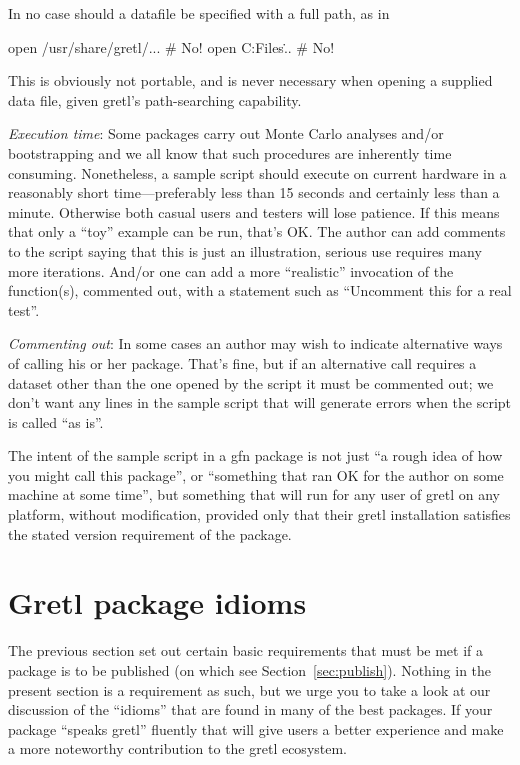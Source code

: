 \documentclass[oneside]{book}
\begin{document}
 In no case should a datafile be specified with a full path, as in
 \begin{code}
 open /usr/share/gretl/...       # No!
 open C:\Program Files\gretl\... # No!
 \end{code}
  This is obviously not portable, and is never necessary when opening
  a supplied data file, given gretl's path-searching capability.

\vspace{1ex}
\textit{Execution time}: Some packages carry out Monte Carlo
  analyses and/or bootstrapping and we all know that such procedures
  are inherently time consuming. Nonetheless, a sample script should
  execute on current hardware in a reasonably short time---preferably
  less than 15 seconds and certainly less than a minute. Otherwise
  both casual users and testers will lose patience. If this means that
  only a ``toy'' example can be run, that's OK. The author can add
  comments to the script saying that this is just an illustration,
  serious use requires many more iterations. And/or one can add a more
  ``realistic'' invocation of the function(s), commented out, with a
  statement such as ``Uncomment this for a real test''.

\vspace{1ex}
\textit{Commenting out}: In some cases an author may wish to
  indicate alternative ways of calling his or her package. That's
  fine, but if an alternative call requires a dataset other than
  the one opened by the script it must be commented out; we don't
  want any lines in the sample script that will generate errors
  when the script is called ``as is''.

\vspace{1ex}
The intent of the sample script in a gfn package is not just ``a rough
idea of how you might call this package'', or ``something that ran OK
for the author on some machine at some time'', but something that will
run for any user of gretl on any platform, without modification,
provided only that their gretl installation satisfies the stated
version requirement of the package.

\section{Gretl package idioms}
\label{sec:idioms}

The previous section set out certain basic requirements that must be
met if a package is to be published (on which see
Section~\ref{sec:publish}). Nothing in the present section is a
requirement as such, but we urge you to take a look at our discussion
of the ``idioms'' that are found in many of the best packages. If your
package ``speaks gretl'' fluently that will give users a better
experience and make a more noteworthy contribution to the gretl
ecosystem.
\end{document}
